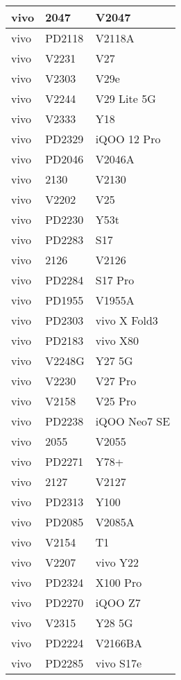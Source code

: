 \begin{tabularx}{\linewidth}{|l|X|X|}
        vivo & 2047 & V2047 \\ \hline
        vivo & PD2118 & V2118A \\ \hline
        vivo & V2231 & V27 \\ \hline
        vivo & V2303 & V29e \\ \hline
        vivo & V2244 & V29 Lite 5G \\ \hline
        vivo & V2333 & Y18 \\ \hline
        vivo & PD2329 & iQOO 12 Pro \\ \hline
        vivo & PD2046 & V2046A \\ \hline
        vivo & 2130 & V2130 \\ \hline
        vivo & V2202 & V25 \\ \hline
        vivo & PD2230 & Y53t \\ \hline
        vivo & PD2283 & S17 \\ \hline
        vivo & 2126 & V2126 \\ \hline
        vivo & PD2284 & S17 Pro \\ \hline
        vivo & PD1955 & V1955A \\ \hline
        vivo & PD2303 & vivo X Fold3 \\ \hline
        vivo & PD2183 & vivo X80 \\ \hline
        vivo & V2248G & Y27 5G \\ \hline
        vivo & V2230 & V27 Pro \\ \hline
        vivo & V2158 & V25 Pro \\ \hline
        vivo & PD2238 & iQOO Neo7 SE \\ \hline
        vivo & 2055 & V2055 \\ \hline
        vivo & PD2271 & Y78+ \\ \hline
        vivo & 2127 & V2127 \\ \hline
        vivo & PD2313 & Y100 \\ \hline
        vivo & PD2085 & V2085A \\ \hline
        vivo & V2154 & T1 \\ \hline
        vivo & V2207 & vivo Y22 \\ \hline
        vivo & PD2324 & X100 Pro \\ \hline
        vivo & PD2270 & iQOO Z7 \\ \hline
        vivo & V2315 & Y28 5G \\ \hline
        vivo & PD2224 & V2166BA \\ \hline
        vivo & PD2285 & vivo S17e \\ \hline

\end{tabularx}
